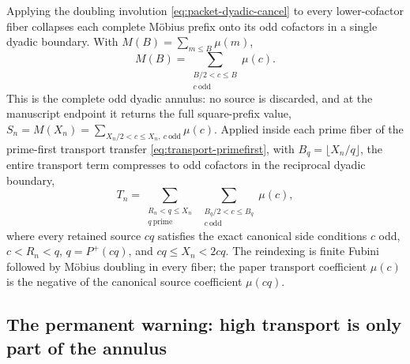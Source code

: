 \documentclass[11pt]{article}
\theoremstyle{definition}
\newcommand{\Pplus}{P^{+}}
\newcommand{\1}{\mathbf{1}}
\begin{document}
Applying the doubling involution \cref{eq:packet-dyadic-cancel} to every lower-cofactor fiber collapses each complete Möbius prefix onto its odd cofactors in a single dyadic boundary.  With $M(B)=\sum_{m\le B}\mu(m)$,
\begin{equation}
 \boxed{
 M(B)=\!\!\sum_{\substack{B/2<c\le B\\ c\ \mathrm{odd}}}\!\!\mu(c).
 }
 \label{eq:odd-annulus-identity}
\end{equation}
This is the complete odd dyadic annulus: no source is discarded, and at the manuscript endpoint it returns the full square-prefix value, $S_n=M(X_n)=\sum_{X_n/2<c\le X_n,\ c\ \mathrm{odd}}\mu(c)$.  Applied inside each prime fiber of the prime-first transport transfer \cref{eq:transport-primefirst}, with $B_q=\lfloor X_n/q\rfloor$, the entire transport term compresses to odd cofactors in the reciprocal dyadic boundary,
\begin{equation}
 \boxed{
 T_n=\!\!\sum_{\substack{R_n<q\le X_n\\ q\ \mathrm{prime}}}\
 \sum_{\substack{B_q/2<c\le B_q\\ c\ \mathrm{odd}}}\!\!\mu(c),
 }
 \label{eq:transport-dyadic}
\end{equation}
where every retained source $cq$ satisfies the exact canonical side conditions $c$ odd, $c<R_n<q$, $q=\Pplus(cq)$, and $cq\le X_n<2cq$.  The reindexing is finite Fubini followed by M\"obius doubling in every fiber; the paper transport coefficient $\mu(c)$ is the negative of the canonical source coefficient $\mu(cq)$.

\subsection{The permanent warning: high transport is only part of the annulus}
\end{document}
